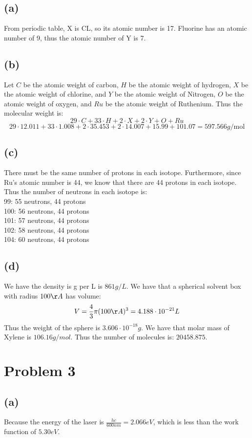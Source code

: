 \subsection*{(a)}
From periodic table, 
X is CL, so its atomic number is 17. Fluorine 
has an atomic number of 9, thus the atomic number of 
Y is 7.
\subsection*{(b)}
Let $C$ be the atomic weight 
of carbon, $H$ be the atomic weight of hydrogen,
$X$ be the atomic weight of chlorine, and $Y$ be the atomic weight of
Nitrogen, $O$ be the atomic weight 
of oxygen, and $Ru$ be the atomic weight of Ruthenium.
Thus the molecular weight is:
$$29\cdot C+33\cdot H+2\cdot X+2\cdot Y+ O+Ru$$
$$29\cdot 12.011+33\cdot 1.008+2\cdot 35.453+2\cdot 14.007+15.99+101.07= \boxed{597.566 g/\text{mol}}$$
\subsection*{(c)}
There must be the same number of protons in each isotope. Furthermore, 
since Ru's atomic number is 44, we know that there are 44 protons in
each isotope. Thus the number of neutrons in each isotope is:\\
99: 55 neutrons, 44 protons\\
100: 56 neutrons, 44 protons\\
101: 57 neutrons, 44 protons\\
102: 58 neutrons, 44 protons\\
104: 60 neutrons, 44 protons\\
\subsection*{(d)}
We have the density is g per L is $861g/L$. We have that 
a spherical solvent box with radius $100\AA$ has volume:
$$V=\frac{4}{3}\pi (100\AA)^3=4.188\cdot10^{-21}L$$
Thus the weight of the sphere is $3.606\cdot10^{-18}g$. 
We have that molar mass of Xylene is $106.16 g/mol$. 
Thus the number of molecules is: $20458.875$.
\section*{Problem 3}
\subsection*{(a)}
Because the energy of the laser is $\frac{hc}{600nm}=2.066eV$, 
which is less than the work function of $5.30eV$.
